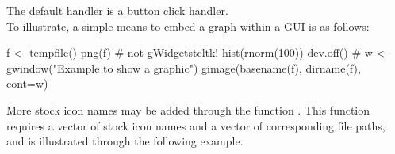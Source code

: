 The default handler is a button click handler.
\\

To illustrate, a simple means to embed a graph within a GUI is as follows:
\begin{Schunk}
\begin{Sinput}
 f <- tempfile()
 png(f)                                  # not gWidgetstcltk!
 hist(rnorm(100))
 dev.off()
 #
 w <- gwindow("Example to show a graphic")
 gimage(basename(f), dirname(f), cont=w)
\end{Sinput}
\end{Schunk}
%

More stock icon names may be added through the function
. This function requires a vector of stock icon
names and a vector of corresponding file paths, and is illustrated
through the following example.


